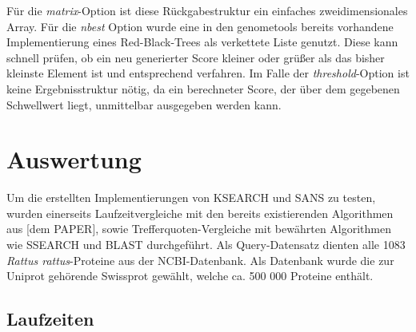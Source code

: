 \documentclass{article}
\begin{document}
Für die \emph{matrix}-Option ist diese Rückgabestruktur ein einfaches zweidimensionales Array. Für die \emph{nbest} Option wurde eine in den genometools
bereits vorhandene Implementierung eines Red-Black-Trees als verkettete Liste genutzt. Diese kann schnell prüfen, ob ein neu generierter Score kleiner oder
grüßer als das bisher kleinste Element ist und entsprechend verfahren. Im Falle der \emph{threshold}-Option ist keine Ergebnisstruktur nötig,
da ein berechneter Score, der über dem gegebenen Schwellwert liegt, unmittelbar ausgegeben werden kann.

\section{Auswertung}

Um die erstellten Implementierungen von KSEARCH und SANS zu testen, wurden einerseits Laufzeitvergleiche mit den bereits existierenden Algorithmen aus [dem PAPER], sowie Trefferquoten-Vergleiche mit bewährten Algorithmen wie SSEARCH und BLAST durchgeführt. Als Query-Datensatz dienten alle 1083 \textit{Rattus rattus}-Proteine aus der NCBI-Datenbank. Als Datenbank wurde die zur Uniprot gehörende Swissprot gewählt, welche ca. 500 000 Proteine enthält.

\subsection{Laufzeiten}
\end{document}
